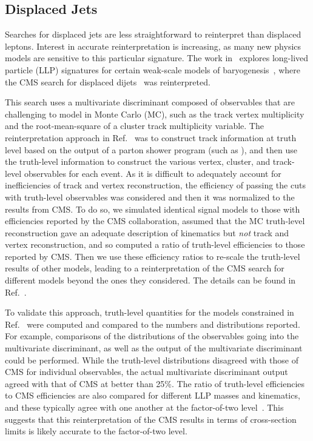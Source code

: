 \subsection{Displaced Jets}
\label{displacedJets}

Searches for displaced jets are less straightforward to reinterpret than
displaced leptons. Interest in accurate reinterpretation is increasing, as many
new physics models are sensitive to this particular signature. The work
in~\cite{Cui:2014twa} explores long-lived particle (LLP) signatures for certain
weak-scale models of baryogenesis~\cite{Cui:2012jh,Cui:2013bta,Cui:2014twa},
where the CMS search for displaced dijets~\cite{CMS-PAS-EXO-12-038} was
reinterpreted.

This search uses a multivariate discriminant composed of observables that are
challenging to model in Monte Carlo (MC), such as the track vertex multiplicity
and the root-mean-square of a cluster track multiplicity variable. The
reinterpretation approach in Ref.~\cite{Cui:2014twa} was to construct track
information at truth level based on the output of a parton shower program (such
as {}), and then use the truth-level information to construct the
various vertex, cluster, and track-level observables for each event. As it is
difficult to adequately account for inefficiencies of track and vertex
reconstruction, the efficiency of passing the cuts with truth-level observables
was considered and then it was normalized to the results from CMS. To do so, we
simulated identical signal models to those with efficiencies reported by the CMS
collaboration, assumed that the MC truth-level reconstruction gave an adequate
description of kinematics but \emph{not} track and vertex reconstruction, and so
computed a ratio of truth-level efficiencies to those reported by CMS. Then we
use these efficiency ratios to re-scale the truth-level results of other models,
leading to a reinterpretation of the CMS search for different models beyond the
ones they considered. The details can be found in Ref.~\cite{Cui:2014twa}.

To validate this approach, truth-level quantities for the models constrained in
Ref.~\cite{CMS-PAS-EXO-12-038} were computed and compared to the numbers and
distributions reported. For example,
comparisons of the distributions of the observables going into the multivariate
discriminant, as well as the output of the multivariate discriminant could be
performed. While the truth-level distributions disagreed with those of CMS for
individual observables, the actual multivariate discriminant output agreed with
that of CMS at better than 25\%. The ratio of truth-level efficiencies to CMS
efficiencies are also compared for different LLP masses and kinematics, and
these typically agree with one another at the factor-of-two
level~\cite{Cui:2014twa}. This suggests that this reinterpretation of the CMS
results in terms of cross-section limits is likely accurate to the factor-of-two level.

